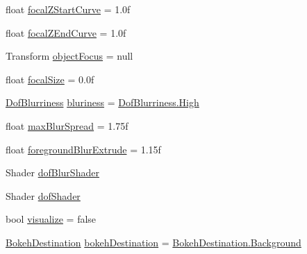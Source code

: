 \begin{DoxyCompactItemize}
\item 
float \mbox{\hyperlink{class_unity_standard_assets_1_1_image_effects_1_1_depth_of_field_deprecated_a7124112016ac9731c8e52b01e0c8ff7d}{focal\+Z\+Start\+Curve}} = 1.\+0f
\item 
float \mbox{\hyperlink{class_unity_standard_assets_1_1_image_effects_1_1_depth_of_field_deprecated_ac84bba63308ad0981ee5554ba76c0432}{focal\+Z\+End\+Curve}} = 1.\+0f
\item 
Transform \mbox{\hyperlink{class_unity_standard_assets_1_1_image_effects_1_1_depth_of_field_deprecated_ab2ee5ce0533997ce0b5edcbef5dc4aff}{object\+Focus}} = null
\item 
float \mbox{\hyperlink{class_unity_standard_assets_1_1_image_effects_1_1_depth_of_field_deprecated_a102ad8d0b5cb5cb9e3df406c01142021}{focal\+Size}} = 0.\+0f
\item 
\mbox{\hyperlink{class_unity_standard_assets_1_1_image_effects_1_1_depth_of_field_deprecated_ab394b77a427ae602eb2f1d7be04950b2}{Dof\+Blurriness}} \mbox{\hyperlink{class_unity_standard_assets_1_1_image_effects_1_1_depth_of_field_deprecated_a77759e2b67a949cb901ac15d061abeed}{bluriness}} = \mbox{\hyperlink{class_unity_standard_assets_1_1_image_effects_1_1_depth_of_field_deprecated_ab394b77a427ae602eb2f1d7be04950b2a655d20c1ca69519ca647684edbb2db35}{Dof\+Blurriness.\+High}}
\item 
float \mbox{\hyperlink{class_unity_standard_assets_1_1_image_effects_1_1_depth_of_field_deprecated_ae3314fe3837eb17137baa9a5c25420c5}{max\+Blur\+Spread}} = 1.\+75f
\item 
float \mbox{\hyperlink{class_unity_standard_assets_1_1_image_effects_1_1_depth_of_field_deprecated_a041945d9d0ea0ddb235fe20cfca2e8ee}{foreground\+Blur\+Extrude}} = 1.\+15f
\item 
Shader \mbox{\hyperlink{class_unity_standard_assets_1_1_image_effects_1_1_depth_of_field_deprecated_a861dfceb4c5f5d735ad11457d3b23041}{dof\+Blur\+Shader}}
\item 
Shader \mbox{\hyperlink{class_unity_standard_assets_1_1_image_effects_1_1_depth_of_field_deprecated_aace17f0927b1ac4af274a81d7246796e}{dof\+Shader}}
\item 
bool \mbox{\hyperlink{class_unity_standard_assets_1_1_image_effects_1_1_depth_of_field_deprecated_a9a6faaa58543959a9ad7ced4e6dd48e9}{visualize}} = false
\item 
\mbox{\hyperlink{class_unity_standard_assets_1_1_image_effects_1_1_depth_of_field_deprecated_ad61f7567f3a8ba6895d21aca4eee1884}{Bokeh\+Destination}} \mbox{\hyperlink{class_unity_standard_assets_1_1_image_effects_1_1_depth_of_field_deprecated_a83c6e03b29ecd5f07874e1462715969f}{bokeh\+Destination}} = \mbox{\hyperlink{class_unity_standard_assets_1_1_image_effects_1_1_depth_of_field_deprecated_ad61f7567f3a8ba6895d21aca4eee1884aa9ded1e5ce5d75814730bb4caaf49419}{Bokeh\+Destination.\+Background}}

\end{DoxyCompactItemize}
